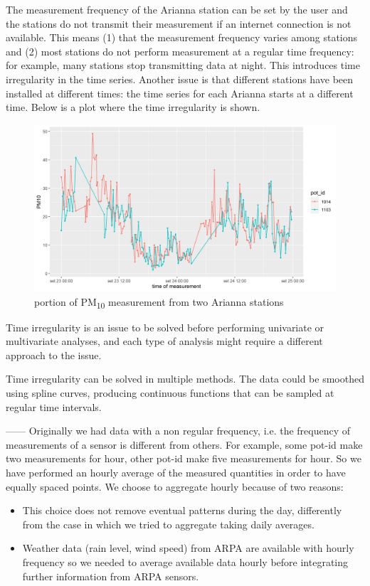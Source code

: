 \documentclass{article}
\begin{document}
The measurement frequency of the Arianna station can be set by the user and the stations do not transmit their measurement if
an internet connection is not
available. This means (1) that the measurement frequency varies among stations and (2) most stations do not perform measurement
at a regular time frequency:
for example, many stations stop transmitting data at night. This introduces time irregularity in the time series.
Another issue is that different stations have been installed at different times: the time series for each Arianna starts at
a different time. Below is a plot where the time irregularity is shown.

\begin{figure}[h!]
  \centering
  \includegraphics[width=5in]{timeIrregularity.png}
  \caption{portion of PM\textsubscript{10} measurement from two Arianna stations}
\end{figure}

Time irregularity is an issue to be solved before performing univariate or multivariate analyses, and each type of analysis might require a different approach to the issue.

Time irregularity can be solved in multiple methods. The data could be smoothed using spline curves, producing continuous
functions that can be sampled at regular time intervals. 

------
Originally we had data with a non regular frequency, i.e. the frequency of measurements of a sensor 
is different from others. For example, some pot-id make two measurements for hour, other pot-id make 
five measurements for hour. So we have performed an hourly average of the measured quantities in order to have equally spaced points. We choose to aggregate hourly because of two reasons: 
\begin{itemize}
\item This choice does not remove eventual patterns during the day, differently from the case in which we tried to aggregate taking daily averages. 
\item Weather data (rain level, wind speed) from ARPA are available with hourly frequency so we needed to average 
available data hourly before integrating further information from ARPA sensors. 
\end{itemize}
\end{document}

